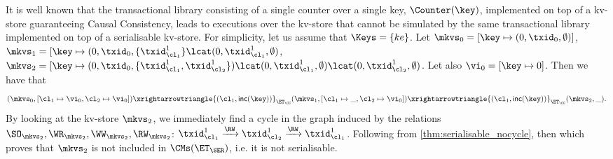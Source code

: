 It is well known that the transactional library consisting of a single counter over a single 
key, $\Counter(\key)$, implemented on top of a kv-store guaranteeing Causal Consistency, 
leads to executions over the kv-store that cannot be simulated by the same transactional 
library implemented on top of a serialisable kv-store. 
For simplicity, let us assume that $\Keys = \{ke\}$.
Let $\mkvs_{0} = [\key \mapsto (0, \txid_{0}, \emptyset)]$,  
$\mkvs_1 = [\key \mapsto (0, \txid_{0}, \{\txid_{\cl_1}^{1}\} \lcat (0, \txid_{\cl_1}^{1}, \emptyset)$, 
$\mkvs_2 = [\key \mapsto (0, \txid_{0}, \{\txid_{\cl_1}^{1}, \txid_{\cl_2}^{1}\}) \lcat (0, \txid_{\cl_1}^{1}, \emptyset) 
\lcat (0, \txid_{\cl_2}^{1}, \emptyset)$. Let also
$\vi_{0} = [\key \mapsto {0}]$. Then we have that 
\[
(\mkvs_{0}, [\cl_1 \mapsto \vi_0, \cl_2 \mapsto \vi_0]) \xrightarrowtriangle{(\cl_1, \mathsf{inc(\key)})}_{\ET_{\CC}} 
(\mkvs_1, [\cl_1 \mapsto \_, \cl_2 \mapsto \vi_0]) \xrightarrowtriangle{(\cl_1, \mathsf{inc(\key)})}_{\ET_{\CC}} 
(\mkvs_2, \_).
\]
By looking at the kv-store $\mkvs_{2}$, we immediately find a cycle in the graph induced by 
the relations $\SO_{\mkvs_{2}}, \WR_{\mkvs_{2}}, \WW_{\mkvs_{2}}, \RW_{\mkvs_{2}}$: 
$\txid_{\cl_1}^{1} \xrightarrow{\RW} \txid_{\cl_2}^{1} \xrightarrow{\RW} \txid_{\cl_1}^{1}$. 
Following from \cref{thm:serialisable_nocycle}, then 
which proves that $\mkvs_2$ is not included in $\CMs(\ET_{\SER})$, i.e. it is 
not serialisable.


